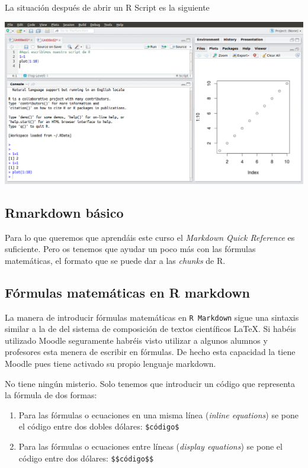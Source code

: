 \documentclass[]{article}
\begin{document}
La situación después de abrir un R Script es la siguiente

\includegraphics{figures/RStudio_RScript1.png}

\subsection{Rmarkdown básico}\label{rmarkdown-basico}

Para lo que queremos que aprendáis este curso el \emph{Markdown Quick
Reference} es suficiente. Pero os tenemos que ayudar un poco más con las
fórmulas matemáticas, el formato que se puede dar a las \emph{chunks} de
R.

\subsection{Fórmulas matemáticas en R markdown
}\label{formulas-matematicas-en-r-markdown}

La manera de introducir fórmulas matemáticas en \texttt{R Markdown}
sigue una sintaxis similar a la de del sistema de composición de textos
científicos LaTeX. Si habéis utilizado Moodle seguramente habréis visto
utilizar a algunos alumnos y profesores esta menera de escribir en
fórmulas. De hecho esta capacidad la tiene Moodle pues tiene activado su
propio lenguaje markdown.

No tiene ningún misterio. Solo tenemos que introducir un código que
representa la fórmula de dos formas:

\begin{enumerate}
\def\labelenumi{\arabic{enumi}.}
\itemsep1pt\parskip0pt
\item
  Para las fórmulas o ecuaciones en una misma línea (\emph{inline
  equations}) se pone el código entre dos dobles dólares:
  \texttt{\$código\$}
\item
  Para las fórmulas o ecuaciones entre líneas (\emph{display equations})
  se pone el código entre dos dólares: \texttt{\$\$código\$\$}
\end{enumerate}
\end{document}
